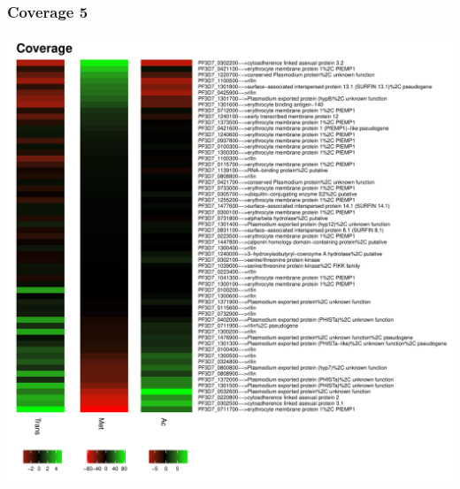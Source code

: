 \documentclass{article}\usepackage[]{graphicx}\usepackage[]{color}
\newenvironment{knitrout}{}{} %
\begin{document}
\subsubsection{Coverage 5}
\begin{knitrout}
\color{fgcolor}

{\centering \includegraphics[width=.9\linewidth]{figure/minimal-met_cov_5-1} 

}



\end{knitrout}
\clearpage
\end{document}

